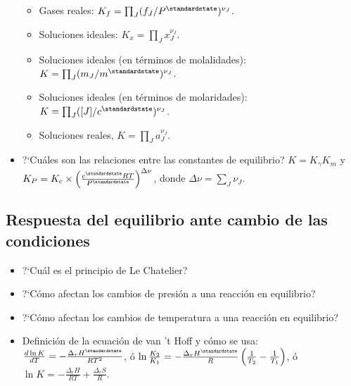 \documentclass[a4paper,12pt]{article}
\begin{document}
\begin{itemize}
\begin{itemize}
  \item Gases reales: $K_f=\prod_J (f_J/P^\standardstate)^{\nu_J}$.
  \item Soluciones ideales: $K_x=\prod_J x_J^{\nu_J}$.
  \item Soluciones ideales (en t\'erminos de molalidades): $K=\prod_J (m_J/m^\standardstate)^{\nu_J}$.
  \item Soluciones ideales (en t\'erminos de molaridades): $K=\prod_J ([J]/c^\standardstate)^{\nu_J}$.
  \item Soluciones reales, $K=\prod_J a_J^{\nu_J}$.
 \end{itemize}
 \item ?`Cu\'ales son las relaciones entre las constantes de equilibrio? $K=K_\gamma K_m$ y $K_P=K_c\times \left(\frac{c^\standardstate RT}{P^\standardstate}\right)^{\Delta\nu}$, donde $\Delta \nu=\sum_J\nu_J$.
\end{itemize}

\subsection*{Respuesta del equilibrio ante cambio de las condiciones}

\begin{itemize}
 \item ?`Cu\'al es el principio de Le Chatelier?
 \item ?`C\'omo afectan los cambios de presi\'on a una reacci\'on en equilibrio?
 \item ?`C\'omo afectan los cambios de temperatura a una reacci\'on en equilibrio?
 \item Definici\'on de la ecuaci\'on de van 't Hoff y c\'omo se usa: $\frac{d\ln K}{dT}=-\frac{\Delta_rH^\standardstate}{RT^2}$, \'o $\ln\frac{K_2}{K_1}=-\frac{\Delta_rH^\standardstate}{R}\left(\frac{1}{T_2}-\frac{1}{T_1}\right)$, \'o $\ln K=-\frac{\Delta_rH}{RT}+\frac{\Delta_rS}{R}$.
\end{itemize}
 
\end{document}
